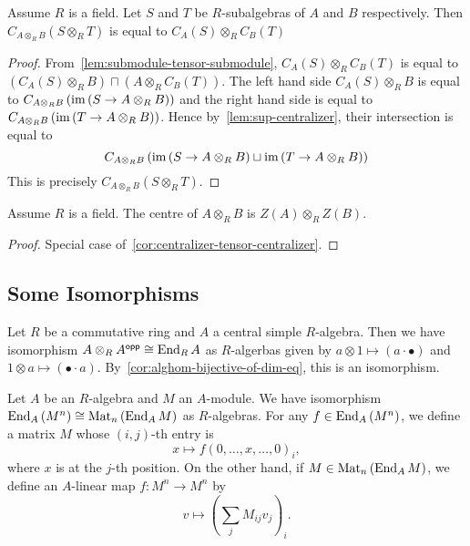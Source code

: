 \begin{corollary}\label{cor:centralizer-tensor-centralizer}
  Assume $R$ is a field. Let $S$ and $T$ be $R$-subalgebras of $A$ and $B$
  respectively. Then $C_{A\otimes_{R}B}\left(S\otimes_{R}T\right)$ is equal to
  $C_{A}(S)\otimes_{R}C_{B}(T)$ \leanok {}
\end{corollary}
\begin{proof}
  From~\cref{lem:submodule-tensor-submodule}, $C_{A}(S)\otimes_{R}C_{B}(T)$ is
  equal to
  $\left(C_{A}(S)\otimes_{R} B\right)\sqcap \left(A\otimes_{R}C_{B}(T)\right)$.
  The left hand side $C_{A}(S)\otimes_{R} B$ is equal to
  $C_{A\otimes_{R}B}\left(\operatorname{im}\left(S\to A\otimes_{R}B\right)\right)$ and the
  right hand side is equal to
  $C_{A\otimes_{R}B}\left(\operatorname{im}\left(T\to A\otimes_{R}B\right)\right)$. Hence
  by~\cref{lem:sup-centralizer}, their intersection is equal to
  \[C_{A\otimes_{R}B}\left(\operatorname{im}\left(S\to A\otimes_{R} B\right)\sqcup \operatorname{im}\left(T\to A\otimes_{R}B\right)\right)\]
  This is precisely $C_{A\otimes_{R}B}\left(S\otimes_{R}T\right)$.
\end{proof}

\begin{corollary}
  \label{cor:center-tensor-center}
  Assume $R$ is a field. The centre of $A\otimes_{R} B$ is
  $Z\left(A\right)\otimes_{R}Z\left(B\right)$. \leanok
\end{corollary}
\begin{proof}
  Special case of~\cref{cor:centralizer-tensor-centralizer}.
\end{proof}

\subsection{Some Isomorphisms}

\begin{construction}
  \label{con:self-tensor-opp-iso-end}
  Let $R$ be a commutative ring and $A$ a central simple $R$-algebra. Then we
  have isomorphism $A\otimes_{R}A^{\mathsf{opp}} \cong \operatorname{End}_{R}A$ as $R$-algerbas given
  by $a\otimes 1 \mapsto (a\cdot\bullet)$ and
  $1\otimes a \mapsto (\bullet\cdot a)$.
  By~\cref{cor:alghom-bijective-of-dim-eq}, this is an isomorphism.
\end{construction}

\begin{construction}
  \label{con:end-vec-iso-matrix}
  Let $A$ be an $R$-algebra and $M$ an $A$-module. We have isomorphism
  $\operatorname{End}_{A}\left(M^{n}\right)\cong \operatorname{Mat}_{n}\left(\operatorname{End}_{A}M\right)$ as
  $R$-algebras. For any $f \in \operatorname{End}_{A}\left(M^{n}\right)$, we define a matrix
  $M$ whose $(i,j)$-th entry is
  \[
    x \mapsto f\left(0,\dots,x,\dots,0\right)_{i},
  \]
  where $x$ is at the $j$-th position. On the other hand, if
  $M \in \operatorname{Mat}_{n}\left(\operatorname{End}_{A}M\right)$, we define an $A$-linear map
  $f : M^{n}\to M^{n}$ by
  \[
    v \mapsto \left(\sum_{j}M_{ij}v_{j}\right)_{i}.
  \]
  \leanok {}
\end{construction}
